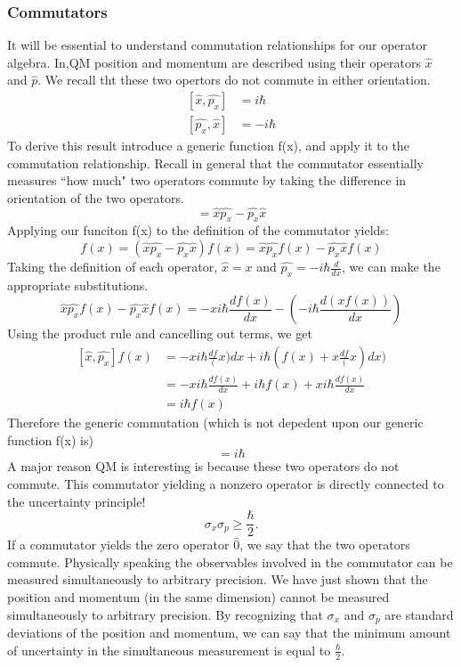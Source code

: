 \documentclass{article}
\newcommand{\be}{\begin{equation}}
\newcommand{\ee}{\end{equation}}
\begin{document}
\subsubsection*{Commutators}
It will be essential to understand commutation relationships for our operator algebra. 
In,QM  position and momentum are described using their operators $\hat{x}$ and $\hat{p}$.
We recall tht these two opertors do not commute in either orientation.
\be
\begin{split}
[\hat{x},\hat{p_x}] &= i \hbar \\
[\hat{p_x},\hat{x}] &= - i \hbar
\end{split}
\ee
To derive this result introduce a generic function f(x), and apply it to the commutation relationship.
Recall in general that the commutator essentially measures ``how much" two operators commute by taking the difference in orientation of the two operators.
\be
[\hat{x},\hat{p_x}] = \hat{x}\hat{p_x} - \hat{p_x}\hat{x}
\ee
Applying our funciton f(x) to the definition of the commutator yields:
\be
[\hat{x},\hat{p_x}]f(x) = (\hat{x} \hat{p_x} - \hat{p_x} \hat{x})f(x) = \hat{x} \hat{p_x}f(x) - \hat{p_x} \hat{x}f(x)
\ee
Taking the definition of each operator, $\hat{x} = x $ and $\hat{p_x} = - i \hbar \frac{d}{dx}$, we can make the appropriate substitutions.
\be
\hat{x} \hat{p_x}f(x) - \hat{p_x} \hat{x}f(x) = - x i \hbar \frac{df(x)}{dx} - (- i \hbar \frac{d(xf(x))}{dx})
\ee
Using the product rule and cancelling out terms, we get
\be
\begin{split}
    [\hat{x},\hat{p_x}]f(x) &= - x i \hbar \frac{df}(x){dx} + i \hbar(f(x) + x \frac{df}(x){dx}) \\
    &= - x i \hbar \frac{df(x)}{dx} + i \hbar f(x) + x i \hbar \frac{df(x)}{dx} \\
    &= i \hbar f(x)
\end{split}
\ee
Therefore the generic commutation (which is not depedent upon our generic function f(x) is)
\be
[\hat{x},\hat{p_x}]= i \hbar
\ee
A major reason QM is interesting is because these two operators do not commute. 
This commutator yielding a nonzero operator is directly connected to the uncertainty principle!
\be
\sigma_x \sigma_p \geq \frac{\hbar}{2}.
\ee
If a commutator yields the zero operator $\hat{0}$, we say that the two operators commute.
Physically speaking the observables involved in the commutator can be measured simultaneously to arbitrary precision.
We have just shown that the position and momentum (in the same dimension) cannot be measured simultaneously to arbitrary precision. 
By recognizing that $\sigma_x$ and $\sigma_p$ are standard deviations of the position and momentum, we can say that the minimum amount of uncertainty in the simultaneous measurement is equal to $\frac{\hbar}{2}$.
\end{document}
